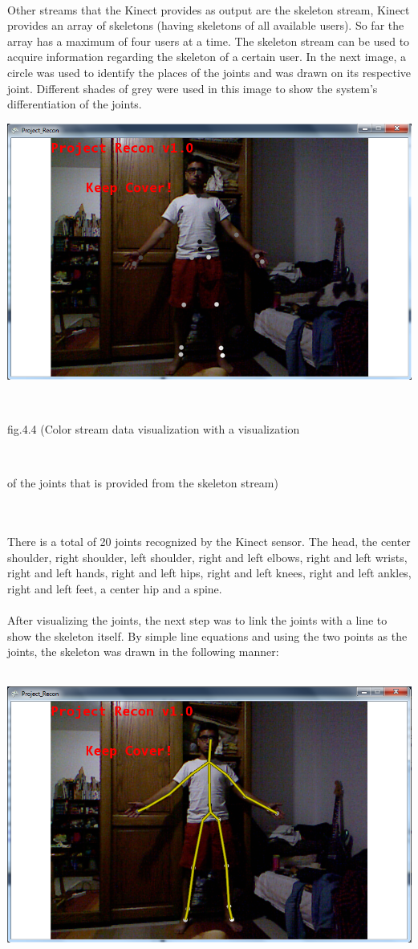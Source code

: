 \documentclass[11pt]{article} %
\begin{document}
\\
Other streams that the Kinect provides as output are the skeleton stream, Kinect provides an array of skeletons (having skeletons of all available users). So far the array has a maximum of four users at a time. The skeleton stream can be used to acquire information regarding the skeleton of a certain user. In the next image, a circle was used to identify the places of the joints and was drawn on its respective joint. Different shades of grey were used in this image to show the system's differentiation of the joints.
\\
\centerline{\includegraphics[scale=0.5]{color_joints.png}}
\\
\centerline{fig.4.4 (Color stream data visualization with a visualization}
\\
\centerline{of the joints that is provided from the skeleton stream)}
\\
\\
There is a total of 20 joints recognized by the Kinect sensor. The head, the center shoulder, right shoulder, left shoulder, right and left elbows, right and left wrists, right and left hands, right and left hips, right and left knees, right and left ankles, right and left feet, a center hip and a spine.
\\
\\
After visualizing the joints, the next step was to link the joints with a line to show the skeleton itself. By simple line equations and using the two points as the joints, the skeleton was drawn in the following manner:
\\
\\
\centerline{\includegraphics[scale=0.5]{color_skeleton.png}}
\end{document}
